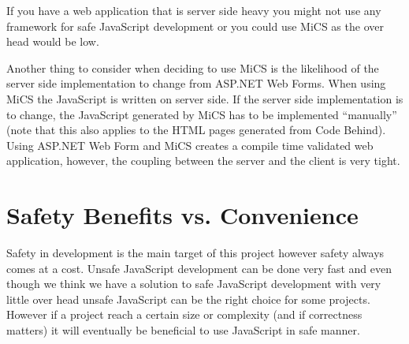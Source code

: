 	If you have a web application that is server side heavy you might not use any framework for safe JavaScript development or you could use MiCS as the over head would be low.

	Another thing to consider when deciding to use MiCS is the likelihood of the server side implementation to change from ASP.NET Web Forms. When using MiCS the JavaScript is written on server side. If the server side implementation is to change, the JavaScript generated by MiCS has to be implemented ``manually'' (note that this also applies to the HTML pages generated from Code Behind). Using ASP.NET Web Form and MiCS creates a compile time validated web application, however, the coupling between the server and the client is very tight.



\section{Safety Benefits vs. Convenience} %
\label{sec:safety_benefits_vs_conveniente}
	Safety in development is the main target of this project however safety always comes at a cost. Unsafe JavaScript development can be done very fast and even though we think we have a solution to safe JavaScript development with very little over head unsafe JavaScript can be the right choice for some projects. However if a project reach a certain size or complexity (and if correctness matters) it will eventually be beneficial to use JavaScript in safe manner.

